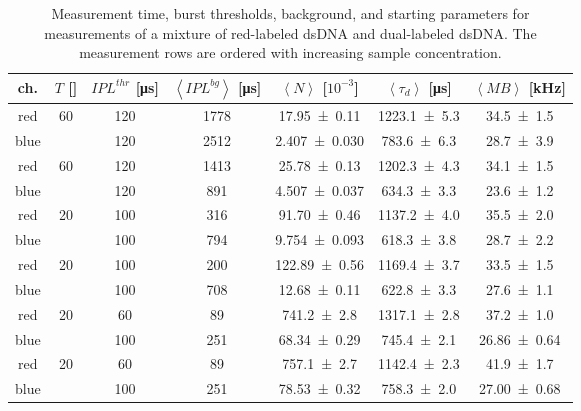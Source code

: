 \begin{table}[h]
	\centering
	\begin{tabular}{c|c|c|c|c|c|c} 
		ch. & $T$ [\si{\min}] & $IPL^{thr}$ [\si{\micro\second}] & $\left\langle IPL^{bg} \right\rangle$ [\si{\micro\second}] & $\left\langle N \right\rangle$ [$10^{-3}$] & $\left\langle \tau_d \right\rangle$ [\si{\micro\second}] & $\left\langle MB \right\rangle$ [\si{\kilo\hertz}] \\
		\hline
		red & \multirow{2}{*}{\num{60}} & \num{120} & \num{1778} & \num{17.95 +- 0.11} & \num{1223.1 +- 5.3} & \num{34.5 +- 1.5}\\
		blue &  & \num{120} & \num{2512} & \num{2.407 +- 0.030} & \num{783.6 +- 6.3} & \num{28.7 +- 3.9} \\
		\hline
		red & \multirow{2}{*}{\num{60}} & \num{120} & \num{1413} & \num{25.78 +- 0.13} & \num{1202.3 +- 4.3} & \num{34.1 +- 1.5}\\
		blue &  & \num{120} & \num{891} & \num{4.507 +- 0.037} & \num{634.3 +- 3.3} & \num{23.6 +- 1.2} \\
		\hline
		red & \multirow{2}{*}{\num{20}} & \num{100} & \num{316} & \num{91.70 +- 0.46} & \num{1137.2 +- 4.0} & \num{35.5 +- 2.0}\\
		blue &  & \num{100} & \num{794} & \num{9.754 +- 0.093} & \num{618.3 +- 3.8} & \num{28.7 +- 2.2} \\
		\hline
		red & \multirow{2}{*}{\num{20}} & \num{100} & \num{200} & \num{122.89 +- 0.56} & \num{1169.4 +- 3.7} & \num{33.5 +- 1.5}\\
		blue &  & \num{100} & \num{708} & \num{12.68 +- 0.11} & \num{622.8 +- 3.3} & \num{27.6 +- 1.1} \\
		\hline
		red & \multirow{2}{*}{\num{20}} & \num{60} & \num{89} & \num{741.2 +- 2.8} & \num{1317.1 +- 2.8} & \num{37.2 +- 1.0}\\
		blue &  & \num{100} & \num{251} & \num{68.34 +- 0.29} & \num{745.4 +- 2.1} & \num{26.86 +- 0.64} \\
		\hline
		red & \multirow{2}{*}{\num{20}} & \num{60} & \num{89} & \num{757.1 +- 2.7} & \num{1142.4 +- 2.3} & \num{41.9 +- 1.7}\\
		blue &  & \num{100} & \num{251} & \num{78.53 +- 0.32} & \num{758.3 +- 2.0} & \num{27.00 +- 0.68} \\
	\end{tabular}
	\caption[Measurement time, burst thresholds, background, and starting parameters for measurements of mixture of red-labeled \gls{dsDNA} and dual-labeled \gls{dsDNA}]{Measurement time, burst thresholds, background, and starting parameters for measurements of a mixture of red-labeled \gls{dsDNA} and dual-labeled \gls{dsDNA}. The measurement rows are ordered with increasing sample concentration.}
	\label{Table:Measurement_rlDNA_dlDNA}
\end{table}

